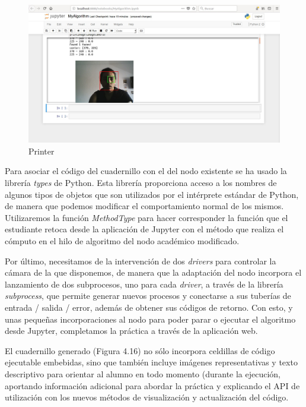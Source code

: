 \begin{figure}[H]
  \begin{center}
    \includegraphics[width=0.98\linewidth]{figures/printer.jpg}
		\caption{Printer}
		\label{fig.printer}
		\end{center}
\end{figure}

Para asociar el código del cuadernillo con el del nodo existente se ha usado la librería \textit{types} de Python. Esta librería proporciona acceso a los nombres de algunos tipos de objetos que son utilizados por el intérprete estándar de Python, de manera que podemos modificar el comportamiento normal de los mismos. Utilizaremos la función \textit{MethodType} para hacer corresponder la función que el estudiante retoca desde la aplicación de Jupyter con el método que realiza el cómputo en el hilo de algoritmo del nodo académico modificado. 

Por último, necesitamos de la intervención de dos \textit{drivers} para controlar la cámara de la que disponemos, de manera que la adaptación del nodo incorpora el lanzamiento de dos subprocesos, uno para cada \textit{driver}, a través de la librería \textit{subprocess}, que permite generar nuevos procesos y conectarse a sus tuberías de entrada / salida / error, además de obtener sus códigos de retorno. Con esto, y unas pequeñas incorporaciones al nodo para poder parar o ejecutar el algoritmo desde Jupyter, completamos la práctica a través de la aplicación web. 

El cuadernillo generado (Figura 4.16) no sólo incorpora celdillas de código ejecutable embebidas, sino que también incluye imágenes representativas y texto descriptivo para orientar al alumno en todo momento (durante la ejecución, aportando información adicional para abordar la práctica y explicando el API de utilización con los nuevos métodos de visualización y actualización del código. 

